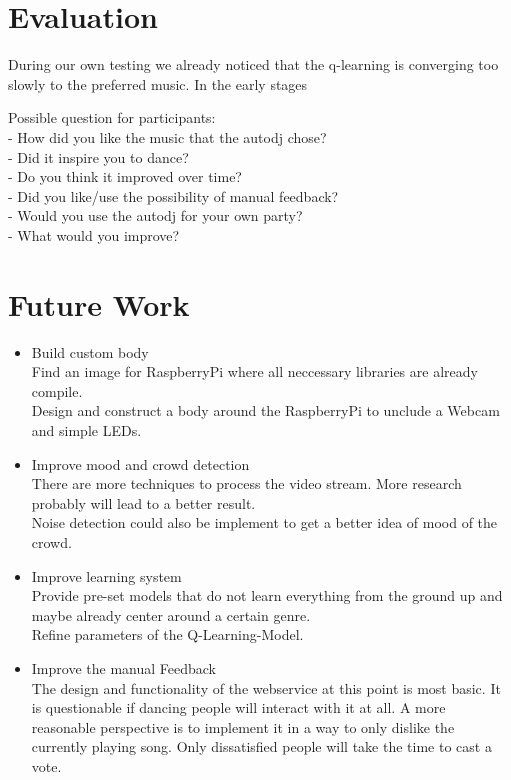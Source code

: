 \documentclass{article}
\begin{document}
\section{Evaluation}


During our own testing we already noticed that the q-learning is converging too slowly to the preferred music. In the early stages 

Possible question for participants:\\
- How did you like the music that the autodj chose?\\
- Did it inspire you to dance?\\
- Do you think it improved over time?\\
- Did you like/use the possibility of manual feedback?\\
- Would you use the autodj for your own party?\\
- What would you improve?


\section{Future Work}


\begin{itemize}
    \item Build custom body\\
        Find an image for RaspberryPi where all neccessary libraries are already compile. \\
        Design and construct a body around the RaspberryPi to unclude a Webcam and simple LEDs.

    \item Improve mood and crowd detection\\
        There are more techniques to process the video stream. More research probably will lead to a better result.\\
        Noise detection could also be implement to get a better idea of mood of the crowd.

    \item Improve learning system \\
        Provide pre-set models that do not learn everything from the ground up and maybe already center around a certain genre.\\
        Refine parameters of the Q-Learning-Model.

    \item Improve the manual Feedback\\
        The design and functionality of the webservice at this point is most basic. It is questionable if dancing people will interact with it at all. A more reasonable perspective is to implement it in a way to only dislike the currently playing song. Only dissatisfied people will take the time to cast a vote.
\end{itemize}
\end{document}
